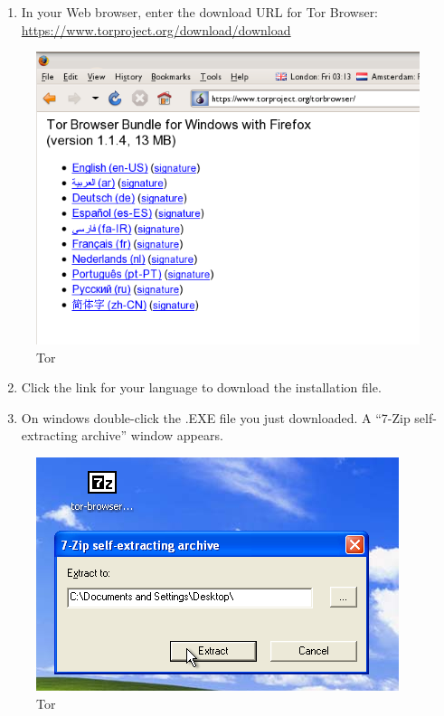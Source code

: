 \begin{enumerate}[1.]
\item
  In your Web browser, enter the download URL for Tor Browser:
  \href{https://www.torproject.org/download/download}{https://www.torproject.org/download/download}
\end{enumerate}
\begin{figure}[htbp]
\centering
\includegraphics{tor_1.png}
\caption{Tor}
\end{figure}

\begin{enumerate}[1.]
\setcounter{enumi}{1}
\item
  Click the link for your language to download the installation file.
\item
  On windows double-click the .EXE file you just downloaded. A ``7-Zip
  self-extracting archive'' window appears.
\end{enumerate}
\begin{figure}[htbp]
\centering
\includegraphics{tor_2.png}
\caption{Tor}
\end{figure}

